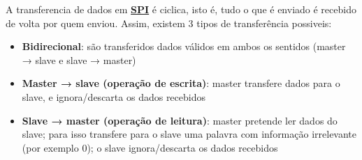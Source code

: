\documentclass[a4paper, 12pt, onecolumn, oneside]{scrartcl}
\begin{document}
A transferencia de dados em \hyperref[spi]{\textbf{SPI}} é ciclica, isto é, tudo o que é enviado é recebido de volta por quem enviou.
Assim, existem 3 tipos de transferência possiveis:
\begin{itemize}
    \item \textbf{Bidirecional}: são transferidos dados válidos em ambos os sentidos
    (master → slave e slave → master)
    \item \textbf{Master → slave (operação de escrita)}: master transfere dados
    para o slave, e ignora/descarta os dados recebidos
    \item \textbf{Slave → master (operação de leitura)}: master pretende ler dados do slave; 
    para isso transfere para o slave uma palavra com informação irrelevante (por exemplo 0); 
    o slave ignora/descarta os dados recebidos
\end{itemize}
\end{document}
